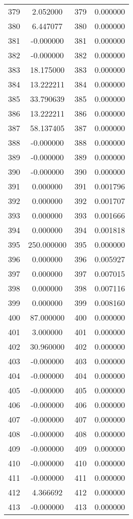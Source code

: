 \documentclass[12pt]{article}
\begin{document}
\begin{longtable}{@{}cccc@{}}
379 & 2.052000 & 379 & 0.000000 \\
380 & 6.447077 & 380 & 0.000000 \\
381 & -0.000000 & 381 & 0.000000 \\
382 & -0.000000 & 382 & 0.000000 \\
383 & 18.175000 & 383 & 0.000000 \\
384 & 13.222211 & 384 & 0.000000 \\
385 & 33.790639 & 385 & 0.000000 \\
386 & 13.222211 & 386 & 0.000000 \\
387 & 58.137405 & 387 & 0.000000 \\
388 & -0.000000 & 388 & 0.000000 \\
389 & -0.000000 & 389 & 0.000000 \\
390 & -0.000000 & 390 & 0.000000 \\
391 & 0.000000 & 391 & 0.001796 \\
392 & 0.000000 & 392 & 0.001707 \\
393 & 0.000000 & 393 & 0.001666 \\
394 & 0.000000 & 394 & 0.001818 \\
395 & 250.000000 & 395 & 0.000000 \\
396 & 0.000000 & 396 & 0.005927 \\
397 & 0.000000 & 397 & 0.007015 \\
398 & 0.000000 & 398 & 0.007116 \\
399 & 0.000000 & 399 & 0.008160 \\
400 & 87.000000 & 400 & 0.000000 \\
401 & 3.000000 & 401 & 0.000000 \\
402 & 30.960000 & 402 & 0.000000 \\
403 & -0.000000 & 403 & 0.000000 \\
404 & -0.000000 & 404 & 0.000000 \\
405 & -0.000000 & 405 & 0.000000 \\
406 & -0.000000 & 406 & 0.000000 \\
407 & -0.000000 & 407 & 0.000000 \\
408 & -0.000000 & 408 & 0.000000 \\
409 & -0.000000 & 409 & 0.000000 \\
410 & -0.000000 & 410 & 0.000000 \\
411 & -0.000000 & 411 & 0.000000 \\
412 & 4.366692 & 412 & 0.000000 \\
413 & -0.000000 & 413 & 0.000000 \\

\end{longtable}
\end{document}
